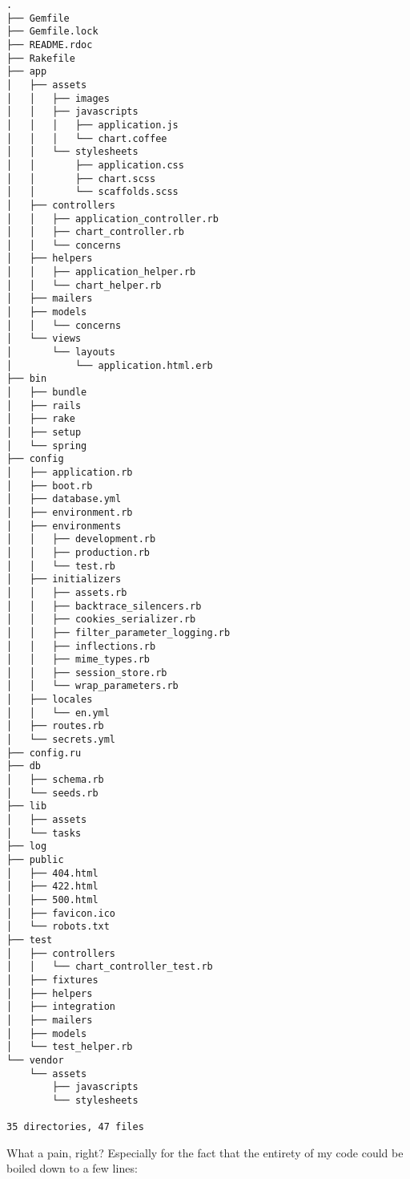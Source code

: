 \begin{verbatim}
.
├── Gemfile
├── Gemfile.lock
├── README.rdoc
├── Rakefile
├── app
│   ├── assets
│   │   ├── images
│   │   ├── javascripts
│   │   │   ├── application.js
│   │   │   └── chart.coffee
│   │   └── stylesheets
│   │       ├── application.css
│   │       ├── chart.scss
│   │       └── scaffolds.scss
│   ├── controllers
│   │   ├── application_controller.rb
│   │   ├── chart_controller.rb
│   │   └── concerns
│   ├── helpers
│   │   ├── application_helper.rb
│   │   └── chart_helper.rb
│   ├── mailers
│   ├── models
│   │   └── concerns
│   └── views
│       └── layouts
│           └── application.html.erb
├── bin
│   ├── bundle
│   ├── rails
│   ├── rake
│   ├── setup
│   └── spring
├── config
│   ├── application.rb
│   ├── boot.rb
│   ├── database.yml
│   ├── environment.rb
│   ├── environments
│   │   ├── development.rb
│   │   ├── production.rb
│   │   └── test.rb
│   ├── initializers
│   │   ├── assets.rb
│   │   ├── backtrace_silencers.rb
│   │   ├── cookies_serializer.rb
│   │   ├── filter_parameter_logging.rb
│   │   ├── inflections.rb
│   │   ├── mime_types.rb
│   │   ├── session_store.rb
│   │   └── wrap_parameters.rb
│   ├── locales
│   │   └── en.yml
│   ├── routes.rb
│   └── secrets.yml
├── config.ru
├── db
│   ├── schema.rb
│   └── seeds.rb
├── lib
│   ├── assets
│   └── tasks
├── log
├── public
│   ├── 404.html
│   ├── 422.html
│   ├── 500.html
│   ├── favicon.ico
│   └── robots.txt
├── test
│   ├── controllers
│   │   └── chart_controller_test.rb
│   ├── fixtures
│   ├── helpers
│   ├── integration
│   ├── mailers
│   ├── models
│   └── test_helper.rb
└── vendor
    └── assets
        ├── javascripts
        └── stylesheets

35 directories, 47 files
\end{verbatim}

What a pain, right? Especially for the fact that the entirety of my code
could be boiled down to a few lines:

\begin{Shaded}
\begin{Highlighting}[]
 \NormalTok{=> }


\NormalTok{::}\NormalTok{, }  


  \NormalTok{< }
     
        \NormalTok{params[}\NormalTok{]).svg}
         
\end{Highlighting}
\end{Shaded}

